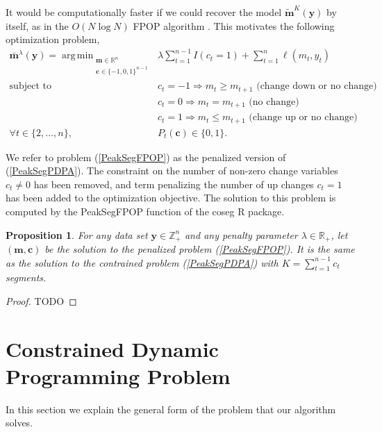 \documentclass{article}
\newtheorem{Proposition}{Proposition}
\DeclareMathOperator*{\argmin}{arg\,min}
\newcommand{\ZZ}{\mathbb Z}
\newcommand{\RR}{\mathbb R}
\begin{document}
It would be computationally faster if we could recover the model
$\mathbf{\tilde m}^{K}(\mathbf y)$ by itself, as in the $O(N\log N)$
FPOP algorithm \citep{johnson, FPOP}. This motivates the following
optimization problem,
\begin{align}
  \mathbf{\bar m}^\lambda(\mathbf y) =
    \argmin_{\substack{
  \mathbf m\in\RR^{n}
\\
  \mathbf c\in\{-1,0,1\}^{n-1}
  }} &\ \ 
\lambda\sum_{t=1}^{n-1} I(c_t =1)
+
\sum_{t=1}^n \ell( m_t,  y_t) 
  \label{PeakSegFPOP}
\\
    \text{subject to} 
& \ \ c_t = -1 \Rightarrow m_{t} \geq m_{t+1} \text{ (change down or no change)}
\nonumber\\
& \ \ c_t = 0 \Rightarrow m_{t} = m_{t+1}  \text{ (no change)}
\nonumber\\
& \ \ c_t = 1 \Rightarrow m_{t} \leq m_{t+1} \text{ (change up or no change)}
\nonumber\\
\forall t\in\{2, \dots, n\}, &\ \ P_t(\mathbf c) \in\{0, 1\}.
\nonumber
\end{align}

We refer to problem (\ref{PeakSegFPOP}) as the penalized version of
(\ref{PeakSegPDPA}). The constraint on the number of non-zero change
variables $c_t\neq 0$ has been removed, and term penalizing the number
of up changes $c_t=1$ has been added to the optimization objective.
The solution to this problem is computed by the PeakSegFPOP function
of the coseg R package.

\begin{Proposition}
  For any data set $\mathbf y\in\ZZ_+^n$ and any penalty parameter
  $\lambda\in\RR_+$, let $(\mathbf m,\mathbf c)$ be the solution to
  the penalized problem (\ref{PeakSegFPOP}). It is the same as the
  solution to the contrained problem (\ref{PeakSegPDPA}) with
  $K=\sum_{t=1}^{n-1} c_t$ segments.
\end{Proposition}

\begin{proof}
  TODO
\end{proof}

\newcommand{\FCC}{\widetilde{C}}
\newcommand{\M}{\mathcal{M}}
\section{Constrained Dynamic Programming Problem}

In this section we explain the general form of the problem that our algorithm solves.
\end{document}
